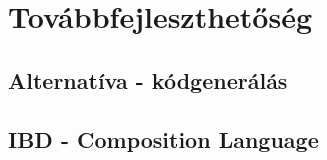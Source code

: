 \chapter{Továbbfejleszthetőség}

\section{Alternatíva - kódgenerálás}

\section{IBD - Composition Language}
